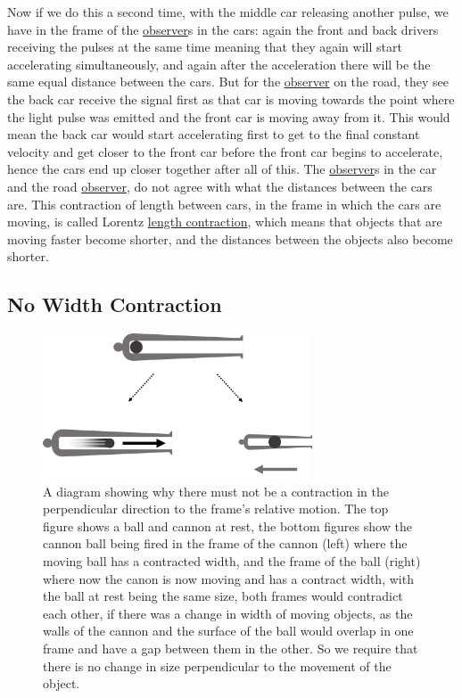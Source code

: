 Now if we do this a second time, with the middle car releasing another pulse, we have in the frame of the \hyperlink{def-observer}{observer}s in the cars: again the front and back drivers receiving the pulses at the same time meaning that they again will start accelerating simultaneously, and again after the acceleration there will be the same equal distance between the cars. But for the \hyperlink{def-observer}{observer} on the road, they see the back car receive the signal first as that car is moving towards the point where the light pulse was emitted and the front car is moving away from it. This would mean the back car would start accelerating first to get to the final constant velocity and get closer to the front car before the front car begins to accelerate, hence the cars end up closer together after all of this. The \hyperlink{def-observer}{observer}s in the car and the road \hyperlink{def-observer}{observer}, do not agree with what the distances between the cars are. This contraction of length between cars, in the frame in which the cars are moving, is called Lorentz \hyperlink{def-length-contraction}{length contraction}, which means that objects that are moving faster become shorter, and the distances between the objects also become shorter.

\subsection{No Width Contraction} \label{width contraction}

\begin{figure}[H]
	\centering
	\includegraphics[width=8cm]{images/pdf/Cannon_Balls.pdf}
	\caption{A diagram showing why there must not be a contraction in the perpendicular direction to the frame's relative motion. The top figure shows a ball and cannon at rest, the bottom figures show the cannon ball being fired in the frame of the cannon (left) where the moving ball has a contracted width, and the frame of the ball (right) where now the canon is now moving and has a contract width, with the ball at rest being the same size, both frames would contradict each other, if there was a change in width of moving objects, as the walls of the cannon and the surface of the ball would overlap in one frame and have a gap between them in the other. So we require that there is no change in size perpendicular to the movement of the object.}
	\label{fig: Cannonball}
\end{figure}

